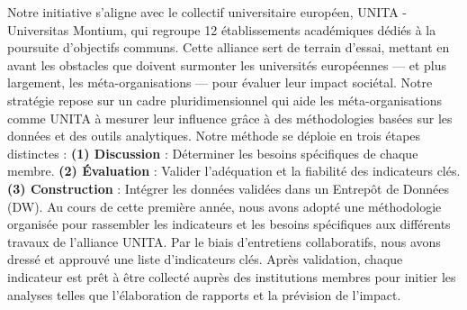 Notre initiative s'aligne avec le collectif universitaire européen, UNITA - Universitas Montium, qui regroupe 12 établissements académiques dédiés à la poursuite d'objectifs communs. Cette alliance sert de terrain d'essai, mettant en avant les obstacles que doivent surmonter les universités européennes — et plus largement, les méta-organisations — pour évaluer leur impact sociétal. Notre stratégie repose sur un cadre pluridimensionnel qui aide les méta-organisations comme UNITA à mesurer leur influence grâce à des méthodologies basées sur les données et des outils analytiques. 
Notre méthode se déploie en trois étapes distinctes : \textbf{(1) Discussion} : Déterminer les besoins spécifiques de chaque membre. \textbf{(2) Évaluation} : Valider l'adéquation et la fiabilité des indicateurs clés. \textbf{(3) Construction} : Intégrer les données validées dans un Entrepôt de Données (DW). 
Au cours de cette première année, nous avons adopté une méthodologie organisée pour rassembler les indicateurs et les besoins spécifiques aux différents travaux de l'alliance UNITA. Par le biais d'entretiens collaboratifs, nous avons dressé et approuvé une liste d'indicateurs clés. Après validation, chaque indicateur est prêt à être collecté auprès des institutions membres pour initier les analyses telles que l'élaboration de rapports et la prévision de l'impact. 
